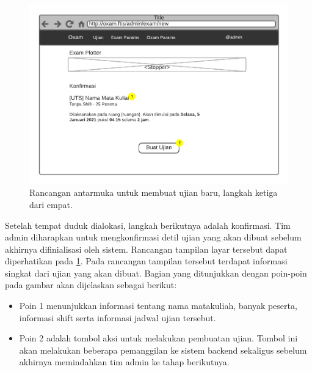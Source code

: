     \begin{figure}
        \centering
        \includegraphics{Gambar/mockups/Mockup--Admin - NewExam-Step 3.pdf}
        \caption{Rancangan antarmuka untuk membuat ujian baru, langkah ketiga dari empat.}
        \label{fig:mockup_admin_exam_create-3}
    \end{figure}
    Setelah tempat duduk dialokasi, langkah berikutnya adalah konfirmasi. Tim
    admin diharapkan untuk mengkonfirmasi detil ujian yang akan dibuat sebelum
    akhirnya difinialisasi oleh sistem. Rancangan tampilan layar tersebut dapat
    diperhatikan pada \ref{fig:mockup_admin_exam_create-3}. Pada rancangan
    tampilan tersebut terdapat informasi singkat dari ujian yang akan dibuat.
    Bagian yang ditunjukkan dengan poin-poin pada gambar akan dijelaskan sebagai
    berikut:
    
    \begin{itemize}
        \item Poin 1 menunjukkan informasi tentang nama matakuliah, banyak
            peserta, informasi shift serta informasi jadwal ujian tersebut.
            
        \item Poin 2 adalah tombol aksi untuk melakukan pembuatan ujian. Tombol
            ini akan melakukan beberapa pemanggilan ke sistem backend sekaligus
            sebelum akhirnya memindahkan tim admin ke tahap berikutnya.
    \end{itemize}
    
